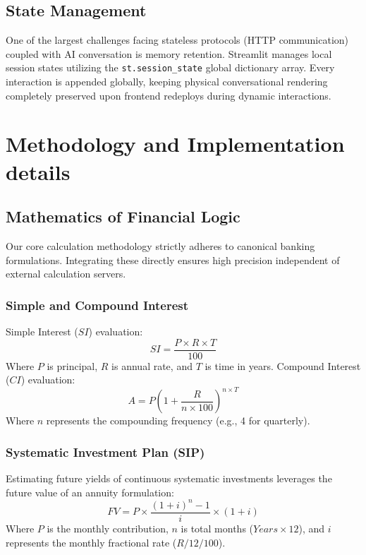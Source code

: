 \documentclass[12pt,a4paper]{report}
\begin{document}
\section{State Management}
One of the largest challenges facing stateless protocols (HTTP communication) coupled with AI conversation is memory retention. Streamlit manages local session states utilizing the \texttt{st.session\_state} global dictionary array. Every interaction is appended globally, keeping physical conversational rendering completely preserved upon frontend redeploys during dynamic interactions.

\chapter{Methodology and Implementation details}

\section{Mathematics of Financial Logic}
Our core calculation methodology strictly adheres to canonical banking formulations. Integrating these directly ensures high precision independent of external calculation servers.

\subsection{Simple and Compound Interest}
Simple Interest ($SI$) evaluation:
\begin{equation}
SI = \frac{P \times R \times T}{100}
\end{equation}
Where $P$ is principal, $R$ is annual rate, and $T$ is time in years.
Compound Interest ($CI$) evaluation:
\begin{equation}
A = P \left(1 + \frac{R}{n \times 100}\right)^{n \times T}
\end{equation}
Where $n$ represents the compounding frequency (e.g., 4 for quarterly).

\subsection{Systematic Investment Plan (SIP)}
Estimating future yields of continuous systematic investments leverages the future value of an annuity formulation:
\begin{equation}
FV = P \times \frac{(1 + i)^n - 1}{i} \times (1 + i)
\end{equation}
Where $P$ is the monthly contribution, $n$ is total months ($Years \times 12$), and $i$ represents the monthly fractional rate ($R / 12 / 100$).
\end{document}
